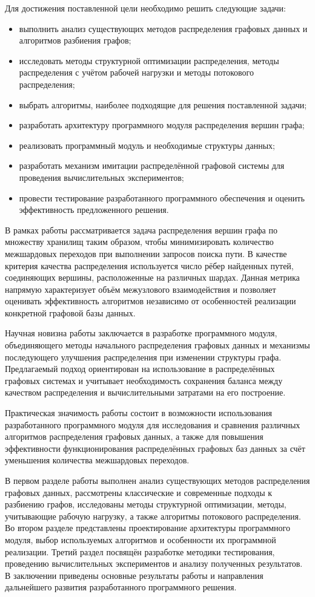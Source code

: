 Для достижения поставленной цели необходимо решить следующие задачи:
\begin{itemize}
\item выполнить анализ существующих методов распределения графовых данных и алгоритмов разбиения графов;
\item исследовать методы структурной оптимизации распределения, методы распределения с учётом рабочей нагрузки и методы потокового распределения;
\item выбрать алгоритмы, наиболее подходящие для решения поставленной задачи;
\item разработать архитектуру программного модуля распределения вершин графа;
\item реализовать программный модуль и необходимые структуры данных;
\item разработать механизм имитации распределённой графовой системы для проведения вычислительных экспериментов;
\item провести тестирование разработанного программного обеспечения и оценить эффективность предложенного решения.
\end{itemize}

В рамках работы рассматривается задача распределения вершин графа по множеству хранилищ таким образом, чтобы минимизировать количество межшардовых переходов при выполнении запросов поиска пути. В качестве критерия качества распределения используется число рёбер найденных путей, соединяющих вершины, расположенные на различных шардах. Данная метрика напрямую характеризует объём межузлового взаимодействия и позволяет оценивать эффективность алгоритмов независимо от особенностей реализации конкретной графовой базы данных.

Научная новизна работы заключается в разработке программного модуля, объединяющего методы начального распределения графовых данных и механизмы последующего улучшения распределения при изменении структуры графа. Предлагаемый подход ориентирован на использование в распределённых графовых системах и учитывает необходимость сохранения баланса между качеством распределения и вычислительными затратами на его построение.

Практическая значимость работы состоит в возможности использования разработанного программного модуля для исследования и сравнения различных алгоритмов распределения графовых данных, а также для повышения эффективности функционирования распределённых графовых баз данных за счёт уменьшения количества межшардовых переходов.

В первом разделе работы выполнен анализ существующих методов распределения графовых данных, рассмотрены классические и современные подходы к разбиению графов, исследованы методы структурной оптимизации, методы, учитывающие рабочую нагрузку, а также алгоритмы потокового распределения. Во втором разделе представлены проектирование архитектуры программного модуля, выбор используемых алгоритмов и особенности их программной реализации. Третий раздел посвящён разработке методики тестирования, проведению вычислительных экспериментов и анализу полученных результатов. В заключении приведены основные результаты работы и направления дальнейшего развития разработанного программного решения.
